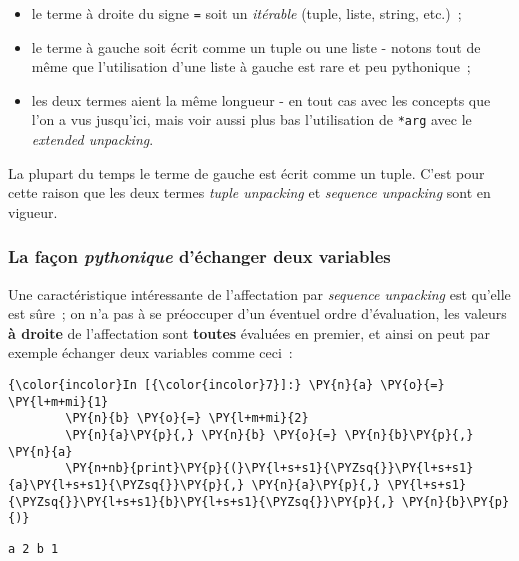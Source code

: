 \begin{itemize}
\tightlist
\item
  le terme à droite du signe \texttt{=} soit un \emph{itérable} (tuple,
  liste, string, etc.)~;
\item
  le terme à gauche soit écrit comme un tuple ou une liste - notons tout
  de même que l'utilisation d'une liste à gauche est rare et peu
  pythonique~;
\item
  les deux termes aient la même longueur - en tout cas avec les concepts
  que l'on a vus jusqu'ici, mais voir aussi plus bas l'utilisation de
  \texttt{*arg} avec le \emph{extended unpacking}.
\end{itemize}

    La plupart du temps le terme de gauche est écrit comme un tuple. C'est
pour cette raison que les deux termes \emph{tuple unpacking} et
\emph{sequence unpacking} sont en vigueur.

    \hypertarget{la-fauxe7on-pythonique-duxe9changer-deux-variables}{%
\subsubsection{\texorpdfstring{La façon \emph{pythonique} d'échanger
deux
variables}{La façon pythonique d'échanger deux variables}}\label{la-fauxe7on-pythonique-duxe9changer-deux-variables}}

    Une caractéristique intéressante de l'affectation par \emph{sequence
unpacking} est qu'elle est sûre~; on n'a pas à se préoccuper d'un
éventuel ordre d'évaluation, les valeurs \textbf{à droite} de
l'affectation sont \textbf{toutes} évaluées en premier, et ainsi on peut
par exemple échanger deux variables comme ceci~:

    \begin{Verbatim}[commandchars=\\\{\},frame=single,framerule=0.3mm,rulecolor=\color{cellframecolor}]
{\color{incolor}In [{\color{incolor}7}]:} \PY{n}{a} \PY{o}{=} \PY{l+m+mi}{1}
        \PY{n}{b} \PY{o}{=} \PY{l+m+mi}{2}
        \PY{n}{a}\PY{p}{,} \PY{n}{b} \PY{o}{=} \PY{n}{b}\PY{p}{,} \PY{n}{a}
        \PY{n+nb}{print}\PY{p}{(}\PY{l+s+s1}{\PYZsq{}}\PY{l+s+s1}{a}\PY{l+s+s1}{\PYZsq{}}\PY{p}{,} \PY{n}{a}\PY{p}{,} \PY{l+s+s1}{\PYZsq{}}\PY{l+s+s1}{b}\PY{l+s+s1}{\PYZsq{}}\PY{p}{,} \PY{n}{b}\PY{p}{)}
\end{Verbatim}


    \begin{Verbatim}[commandchars=\\\{\},frame=single,framerule=0.3mm,rulecolor=\color{cellframecolor}]
a 2 b 1
\end{Verbatim}

